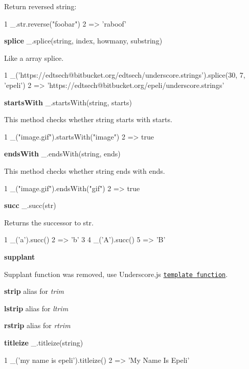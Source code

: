 Return reversed string\+:


\begin{DoxyCode}
1 \_.str.reverse("foobar")
2 => 'raboof'
\end{DoxyCode}


{\bfseries splice} \+\_\+.\+splice(string, index, howmany, substring)

Like a array splice.


\begin{DoxyCode}
1 \_('https://edtsech@bitbucket.org/edtsech/underscore.strings').splice(30, 7, 'epeli')
2 => 'https://edtsech@bitbucket.org/epeli/underscore.strings'
\end{DoxyCode}


{\bfseries starts\+With} \+\_\+.\+starts\+With(string, starts)

This method checks whether string starts with starts.


\begin{DoxyCode}
1 \_("image.gif").startsWith("image")
2 => true
\end{DoxyCode}


{\bfseries ends\+With} \+\_\+.\+ends\+With(string, ends)

This method checks whether string ends with ends.


\begin{DoxyCode}
1 \_("image.gif").endsWith("gif")
2 => true
\end{DoxyCode}


{\bfseries succ} \+\_\+.\+succ(str)

Returns the successor to str.


\begin{DoxyCode}
1 \_('a').succ()
2 => 'b'
3 
4 \_('A').succ()
5 => 'B'
\end{DoxyCode}


{\bfseries supplant}

Supplant function was removed, use Underscore.\+js \href{http://documentcloud.github.com/underscore/#template}{\tt template function}.

{\bfseries strip} alias for {\itshape trim}

{\bfseries lstrip} alias for {\itshape ltrim}

{\bfseries rstrip} alias for {\itshape rtrim}

{\bfseries titleize} \+\_\+.\+titleize(string)


\begin{DoxyCode}
1 \_('my name is epeli').titleize()
2 => 'My Name Is Epeli'
\end{DoxyCode}


